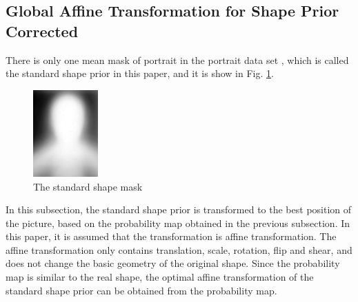\subsection{Global Affine Transformation for Shape Prior Corrected}\label{subsec: Global Affine Transformation for Shape Prior Corrected}
There is only one mean mask of portrait in the portrait data set \cite{FCN:segmentation:shen2016automatic}, which is called the standard shape prior in this paper, and it is show in Fig. \ref{fig: The standard shape mask}.
\begin{figure}[h]
    \centering
    \includegraphics[width = 2.5cm]{figs/meanmask}
    \caption{The standard shape mask}\label{fig: The standard shape mask}
\end{figure}
In this subsection, the standard shape prior is transformed to the best position of the picture, based on the probability map obtained in the previous subsection. In this paper, it is assumed that the transformation is affine transformation. The affine transformation only contains translation, scale, rotation, flip and shear, and does not change the basic geometry of the original shape. Since the probability map is similar to the real shape, the optimal affine transformation of the standard shape prior can be obtained from the probability map.

